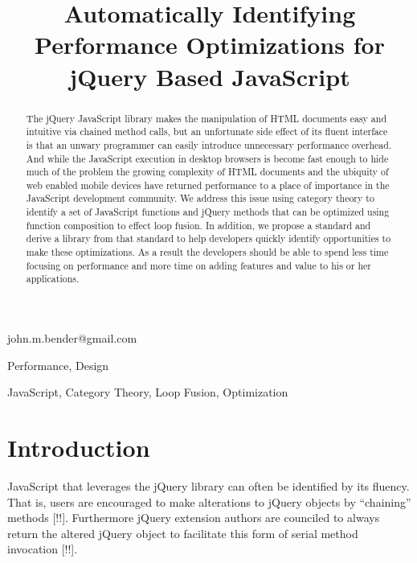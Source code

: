 \documentclass[preprint]{sigplanconf}
\begin{document}
\copyrightdata{[to be supplied]}


\title{Automatically Identifying Performance Optimizations for jQuery Based JavaScript}

           {}
           {john.m.bender@gmail.com}
\maketitle

\begin{abstract}
The jQuery JavaScript library makes the manipulation of HTML documents easy and intuitive via chained method calls, but an unfortunate side effect of its fluent interface is that an unwary programmer can easily introduce unnecessary performance overhead. And while the JavaScript execution in desktop browsers is become fast enough to hide much of the problem the growing complexity of HTML documents and the ubiquity of web enabled mobile devices have returned performance to a place of importance in the JavaScript development community. We address this issue using category theory to identify a set of JavaScript functions and jQuery methods that can be optimized using function composition to effect loop fusion. In addition, we propose a standard and derive a library from that standard to help developers quickly identify opportunities to make these optimizations. As a result the developers should be able to spend less time focusing on performance and more time on adding features and value to his or her applications.
\end{abstract}


\terms
Performance, Design

\keywords
JavaScript, Category Theory, Loop Fusion, Optimization

\section{Introduction}

JavaScript that leverages the jQuery library can often be identified by its fluency. That is, users are encouraged to make alterations to jQuery objects by ``chaining'' methods [!!]. Furthermore jQuery extension authors are counciled to always return the altered jQuery object to facilitate this form of serial method invocation [!!].
\end{document}
